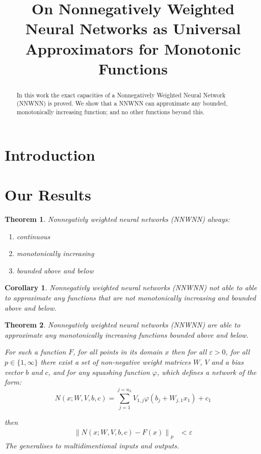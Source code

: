 \documentclass{article} %
\title{On Nonnegatively Weighted Neural Networks as Universal Approximators for Monotonic Functions}
\newtheorem{thm}{Theorem}
\newtheorem{cor}{Corollary}[thm]
\begin{document}
\maketitle

\begin{abstract}
In this work the exact capacities of a Nonnegatively Weighted Neural Network (NNWNN) is proved.
We show that a NNWNN can approximate any bounded, monotonically increasing function;
and no other functions beyond this.
\end{abstract}


\section{Introduction}

\section{Our Results}

\begin{thm} \label{thm:upper}
	Nonnegativly weighted neural networks (NNWNN) always:
	
	\begin{enumerate}
		\item continuous 
		\item monotonically increasing
		\item bounded above and below
	\end{enumerate}
\end{thm}
\begin{cor}\label{cor:noapproxapproximate}
	Nonnegativly weighted neural networks (NNWNN) not able to able to approximate any functions that are not monotonically increasing and bounded above and below.
\end{cor}

\begin{thm} \label{thm:nnwnnuat}
	Nonnegativly weighted neural networks (NNWNN) are able to approximate any monotonically increasing functions bounded above and below.
	
	
	For such a function $F$,
	for all points in its domain $x$
	then for all $\varepsilon > 0$, for all $p\in \lbrace 1, \infty \rbrace$
	there exist a set of non-negative weight matrices $W$, $V$ and a bias vector $b$ and $c$,
	and for any squashing function $\varphi$,
	which defines a network of the form:
	\begin{equation}
		N(x;W,V,b,c)=\sum_{j=1}^{j=n_{h}}V_{1,j}\varphi(b_{j}+W_{j,1}x_{1})+c_{1}
	\end{equation}
	
	then 
	\begin{align}
	\left\| N(x;W,V,b, c) - F(x) \right\|_p &< \varepsilon
	\end{align}
	The generalises to multidimentional inputs and outputs.
\end{thm}
\end{document}
